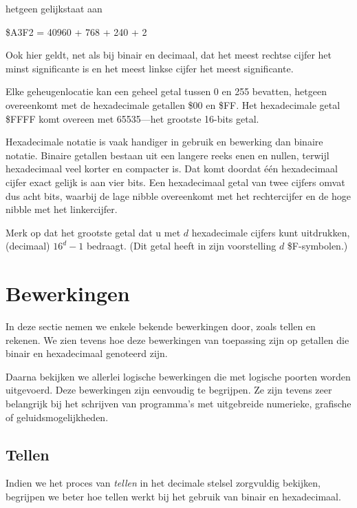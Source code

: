 hetgeen gelijkstaat aan

\begin{center}
	\$A3F2 = 40960 + 768 + 240 + 2
\end{center}

Ook hier geldt, net als bij binair en decimaal, dat het meest rechtse cijfer het minst significante is en het meest linkse cijfer het meest significante.

Elke geheugenlocatie kan een geheel getal tussen 0 en 255 bevatten, hetgeen overeenkomt met de hexadecimale getallen \$00 en \$FF. Het hexadecimale getal \$FFFF komt overeen met 65535---het grootste 16-bits getal.

Hexadecimale notatie is vaak handiger in gebruik en bewerking dan binaire notatie. Binaire getallen bestaan uit een langere reeks enen en nullen, terwijl hexadecimaal veel korter en compacter is. Dat komt doordat één hexadecimaal cijfer exact gelijk is aan vier bits. Een hexadecimaal getal van twee cijfers omvat dus acht bits, waarbij de lage nibble overeenkomt met het rechtercijfer en de hoge nibble met het linkercijfer.

Merk op dat het grootste getal dat u met $d$ hexadecimale cijfers kunt uitdrukken, (decimaal) $16^{d} - 1$ bedraagt. (Dit getal heeft in zijn voorstelling $d$ \$F-symbolen.)

\section{Bewerkingen}In deze sectie nemen we enkele bekende bewerkingen door, zoals tellen en rekenen. We zien tevens hoe deze bewerkingen van toepassing zijn op getallen die binair en hexadecimaal genoteerd zijn.

Daarna bekijken we allerlei logische bewerkingen die met logische poorten worden uitgevoerd. Deze bewerkingen zijn eenvoudig te begrijpen. Ze zijn tevens zeer belangrijk bij het schrijven van programma's met uitgebreide numerieke, grafische of geluidsmogelijkheden.

\subsection{Tellen}Indien we het proces van {\it tellen} in het decimale stelsel zorgvuldig bekijken, begrijpen we beter hoe tellen werkt bij het gebruik van binair en hexadecimaal.

